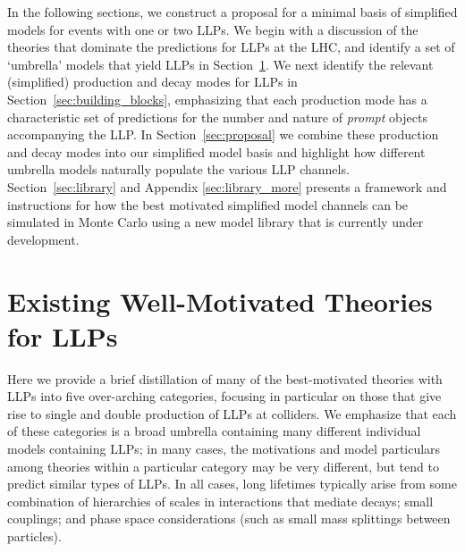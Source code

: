 In the following sections, we construct a proposal for a minimal basis of simplified models for events with one or two LLPs.
We begin with a discussion of the theories that dominate the predictions for LLPs at the LHC, and identify a set of `umbrella' models that yield LLPs in Section~\ref{sec:motivated_theories}.  We next identify the relevant (simplified) production and decay modes for LLPs in Section~\ref{sec:building_blocks},  emphasizing that each production mode has a characteristic set of predictions for the number and nature of {\em prompt} objects accompanying the LLP.  In Section~\ref{sec:proposal} we combine these production and decay modes into our simplified model basis and highlight how different umbrella models naturally populate the various LLP channels.  Section~\ref{sec:library} and Appendix  \ref{sec:library_more}  presents a framework and instructions for how the best motivated simplified model channels can be simulated in Monte Carlo using a new model library that is currently under development. 


\section{Existing Well-Motivated Theories for LLPs}\label{sec:motivated_theories}

Here we provide a brief distillation of many of the best-motivated theories with LLPs into five over-arching categories, focusing in particular on those that give rise to single and double production of LLPs at colliders.  We emphasize that each of these categories is a broad umbrella containing many different individual models containing LLPs; in many cases, the motivations and model particulars among theories within a particular category may be very different, but  tend to predict similar types of LLPs. In all cases, long lifetimes typically arise from some combination of hierarchies of scales in interactions that mediate decays; small couplings; and phase space considerations (such as small mass splittings between particles).

